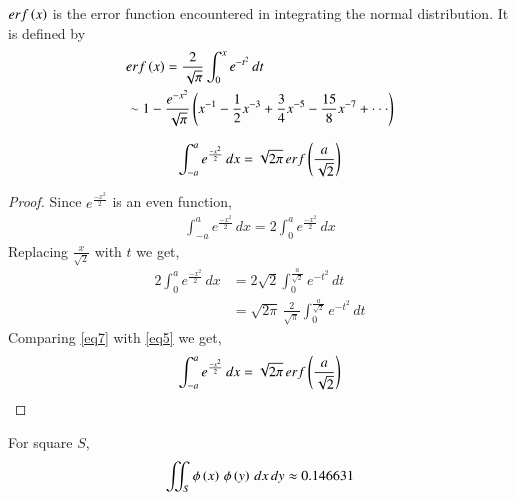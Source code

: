 \documentclass[journal,12pt,twocolumn]{IEEEtran}
\begin{document}
\begin{definition}
$erf\left(x\right)$ is the error function encountered in integrating the normal distribution. It is defined by
\begin{align}
    &erf\left(x\right) = \frac{2}{\sqrt{\pi}} \int_0^x e^{-t^2}\, dt \label{eq5}\\ &\sim 1-\frac{e^{-x^2}}{\sqrt{\pi}}\left(x^{-1} - \frac{1}{2} x^{-3} + \frac{3}{4} x^{-5}-\frac{15}{8}x^{-7}+\cdot\cdot\cdot\right)
\end{align}
\end{definition}

\begin{lemma}
\begin{align}
    \int_{-a}^{a} e^{\frac{-x^2}{2}}\, dx = \sqrt{2\pi}\,erf\left(\frac{a}{\sqrt{2}}\right)\label{eq6}
\end{align}
\end{lemma}

\begin{proof}
Since $e^{\frac{-x^2}{2}}$ is an even function,
\begin{align}
    \int_{-a}^{a} e^{\frac{-x^2}{2}}\, dx = 2\int_{0}^{a} e^{\frac{-x^2}{2}}\, dx
\end{align}
Replacing $\frac{x}{\sqrt{2}}$ with $t$ we get,
\begin{align}
    2\int_{0}^{a} e^{\frac{-x^2}{2}}\, dx &= 2\sqrt{2}\int_0^{\frac{a}{\sqrt{2}}}e^{-t^2}\, dt\\
    &= \sqrt{2\pi}\, \frac{2}{\sqrt{\pi}}\int_0^{\frac{a}{\sqrt{2}}}e^{-t^2}\, dt\label{eq7}
\end{align}
Comparing \eqref{eq7} with \eqref{eq5} we get,
\begin{align}
    \int_{-a}^{a} e^{\frac{-x^2}{2}}\, dx = \sqrt{2\pi}\,erf\left(\frac{a}{\sqrt{2}}\right)
\end{align}
\end{proof}

\begin{lemma}
For square $S$,
\begin{align}
    \iint_S{\phi\left(x\right)\,\phi\left(y\right)\,dx\,dy} \approx 0.146631\label{eq10}
\end{align}
\end{lemma}
\end{document}
